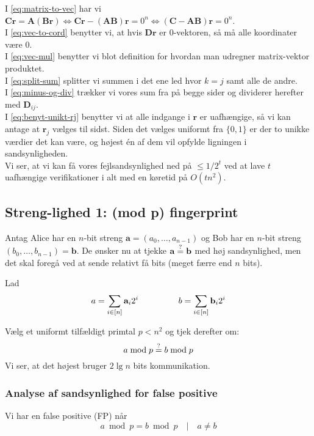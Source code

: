 I \cref{eq:matrix-to-vec} har vi $
\mathbf{Cr} = \mathbf A (\mathbf{Br})
\Longleftrightarrow
\mathbf{Cr} - (\mathbf{AB}) \mathbf{r} = 0^n
\Longleftrightarrow
(\mathbf C - \mathbf{AB}) \mathbf r = 0^n
$.\\
I \cref{eq:vec-to-cord} benytter vi, at hvis $\mathbf{Dr}$ er 0-vektoren, så må alle koordinater være 0.\\
I \cref{eq:vec-mul} benytter vi blot definition for hvordan man udregner matrix-vektor produktet.\\
I \cref{eq:split-sum} splitter vi summen i det ene led hvor $k = j$ samt alle de andre.\\
I \cref{eq:minus-og-div} trækker vi vores sum fra på begge sider og dividerer herefter med $\mathbf D_{ij}$.\\
I \cref{eq:benyt-unikt-rj} benytter vi at alle indgange i $\mathbf r$ er uafhængige, så vi kan antage at $\mathbf r_j$ vælges til sidst. Siden det vælges uniformt fra $\{0, 1\}$ er der to unikke værdier det kan være, og højest én af dem vil opfylde ligningen i sandsynligheden.\\


Vi ser, at vi kan få vores fejlsandsynlighed ned på $\leq 1/2^t$ ved at lave $t$ uafhængige verifikationer i alt med en køretid på $O(t n^2)$.



\subsection{Streng-lighed 1: (mod p) fingerprint}
Antag Alice har en $n$-bit streng $\mathbf a = (a_0, \dots, a_{n-1})$ og Bob har en $n$-bit streng $(b_0, \dots, b_{n-1}) = \mathbf b$. De ønsker nu at tjekke $\mathbf a \stackrel{?}{=} \mathbf b$ med høj sandsynlighed, men det skal foregå ved at sende relativt få bits (meget færre end $n$ bits).

Lad
$$
  a = \sum_{i \in [n]} \mathbf a_i 2^i
  {\ \ \ \ \ \ \ \ \ \ \ \ \ \ }
  b = \sum_{i \in [n]} \mathbf b_i 2^i
$$

Vælg et uniformt tilfældigt primtal $p < n^2$ og tjek derefter om:
$$
  a \bmod p \stackrel{?}{=} b \bmod p
$$
Vi ser, at det højest bruger $2 \lg n$ bits kommunikation.



\subsubsection{Analyse af sandsynlighed for false positive}
Vi har en false positive (FP) når
$$
  a \bmod p = b \bmod p \quad | \quad a \neq b
$$

